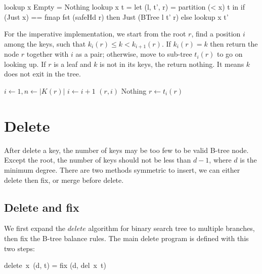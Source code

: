 \documentclass[b5paper]{article}
\begin{document}
\begin{Haskell}
lookup x Empty = Nothing
lookup x t = let (l, t', r) = partition (< x) t in
  if (Just x) == fmap fst (safeHd r) then Just (BTree l t' r)
  else lookup x t'
\end{Haskell}

For the imperative implementation, we start from the root $r$, find a position $i$ among the keys, such that $k_i(r) \leq k < k_{i+1}(r)$. If $k_i(r) = k$ then return the node $r$ together with $i$ as a pair; otherwise, move to sub-tree $t_i(r)$ to go on looking up. If $r$ is a leaf and $k$ is not in its keys, the return nothing. It means $k$ does not exit in the tree.

\begin{algorithmic}[1]
  \Loop
    \State $i \gets 1, n \gets |K(r)|$
      \State $i \gets i + 1$
    \EndWhile
      \State \Return $(r, i)$
    \EndIf
      \State \Return Nothing 
    \Else
      \State $r \gets t_i(r)$ 
    \EndIf
  \EndLoop
\EndFunction
\end{algorithmic}

\begin{Exercise}
\end{Exercise}

\section{Delete}

After delete a key, the number of keys may be too few to be valid B-tree node. Except the root, the number of keys should not be less than $d - 1$, where $d$ is the minimum degree. There are two methods symmetric to insert, we can either delete then fix, or merge before delete.

\subsection{Delete and fix}

We first expand the $delete$ algorithm for binary search tree to multiple branches, then fix the B-tree balance rules. The main delete program is defined with this two steps:

\be
delete\ x\ (d, t) = fix (d, del\ x\ t)
\ee
\end{document}
